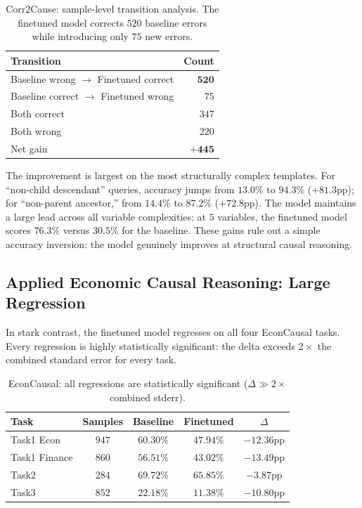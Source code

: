 \documentclass{article}
\begin{document}
\begin{table}[t]
\caption{Corr2Cause: sample-level transition analysis. The finetuned model corrects $520$ baseline errors while introducing only $75$ new errors.}
\label{tab:corr2cause}
\begin{center}
\begin{tabular}{lr}
\toprule
Transition & Count \\
\midrule
Baseline wrong $\rightarrow$ Finetuned correct & $\mathbf{520}$ \\
Baseline correct $\rightarrow$ Finetuned wrong & $75$ \\
Both correct & $347$ \\
Both wrong & $220$ \\
\midrule
Net gain & $\mathbf{+445}$ \\
\bottomrule
\end{tabular}
\end{center}
\end{table}

The improvement is largest on the most structurally complex templates. For ``non-child descendant'' queries, accuracy jumps from $13.0\%$ to $94.3\%$ ($+81.3$pp); for ``non-parent ancestor,'' from $14.4\%$ to $87.2\%$ ($+72.8$pp). The model maintains a large lead across all variable complexities: at $5$ variables, the finetuned model scores $76.3\%$ versus $30.5\%$ for the baseline. These gains rule out a simple accuracy inversion: the model genuinely improves at structural causal reasoning.

\subsection{Applied Economic Causal Reasoning: Large Regression}

In stark contrast, the finetuned model regresses on all four EconCausal tasks. Every regression is highly statistically significant: the delta exceeds $2\times$ the combined standard error for every task.

\begin{table}[t]
\caption{EconCausal: all regressions are statistically significant ($\Delta \gg 2\times$ combined stderr).}
\label{tab:econcausal}
\begin{center}
\begin{tabular}{lcccc}
\toprule
Task & Samples & Baseline & Finetuned & $\Delta$ \\
\midrule
Task1 Econ & $947$ & $60.30\%$ & $47.94\%$ & $\mathbf{-12.36}$pp \\
Task1 Finance & $860$ & $56.51\%$ & $43.02\%$ & $\mathbf{-13.49}$pp \\
Task2 & $284$ & $69.72\%$ & $65.85\%$ & $\mathbf{-3.87}$pp \\
Task3 & $852$ & $22.18\%$ & $11.38\%$ & $\mathbf{-10.80}$pp \\
\bottomrule
\end{tabular}
\end{center}
\end{table}
\end{document}

